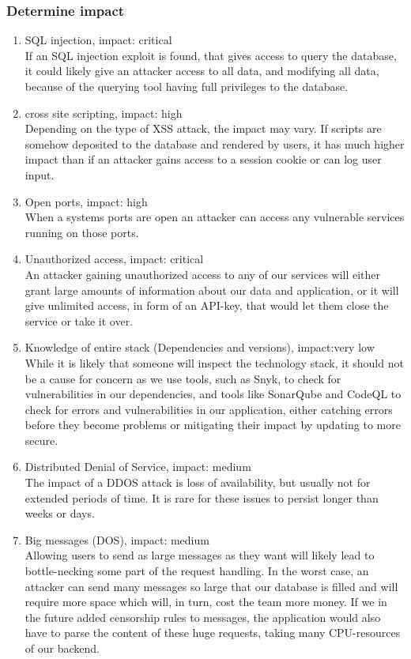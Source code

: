 \subsubsection{Determine impact}
\begin{enumerate}
    \item SQL injection, impact: critical\\
    If an SQL injection exploit is found, that gives access to query the database, it could likely give an attacker access to all data, and modifying all data, because of the querying tool having full privileges to the database.
    \item cross site scripting, impact: high\\
    Depending on the type of XSS attack, the impact may vary. If scripts are somehow deposited to the database and rendered by users, it has much higher impact than if an attacker gains access to a session cookie or can log user input.
    \item Open ports, impact: high\\
    When a systems ports are open an attacker can access any vulnerable services running on those ports.
    \item Unauthorized access, impact: critical\\
    An attacker gaining unauthorized access to any of our services will either grant large amounts of information about our data and application, or it will give unlimited access, in form of an API-key, that would let them close the service or take it over.
    \item Knowledge of entire stack (Dependencies and versions), impact:very low\\
    While it is likely that someone will inspect the technology stack, it should not be a cause for concern as we use tools, such as Snyk, to check for vulnerabilities in our dependencies, and tools like SonarQube and CodeQL to check for errors and vulnerabilities in our application, either catching errors before they become problems or mitigating their impact by updating to more secure.
    \item Distributed Denial of Service, impact: medium \\
    The impact of a DDOS attack is loss of availability, but usually not for extended periods of time. It is rare for these issues to persist longer than weeks or days.  
    \item Big messages (DOS), impact: medium\\
    Allowing users to send as large messages as they want will likely lead to bottle-necking some part of the request handling. In the worst case, an attacker can send many messages so large that our database is filled and will require more space which will, in turn, cost the team more money. If we in the future added censorship rules to messages, the application would also have to parse the content of these huge requests, taking many CPU-resources of our backend.
    
\end{enumerate}